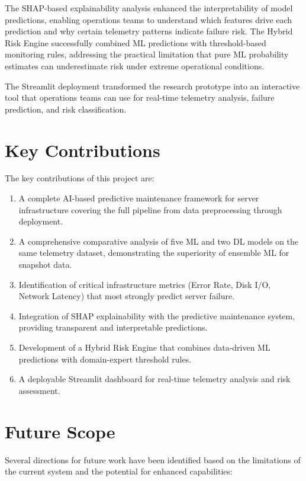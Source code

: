 \documentclass[12pt,letterpaper]{report}
\begin{document}
The SHAP-based explainability analysis enhanced the interpretability of model predictions, enabling operations teams to understand which features drive each prediction and why certain telemetry patterns indicate failure risk. The Hybrid Risk Engine successfully combined ML predictions with threshold-based monitoring rules, addressing the practical limitation that pure ML probability estimates can underestimate risk under extreme operational conditions.

The Streamlit deployment transformed the research prototype into an interactive tool that operations teams can use for real-time telemetry analysis, failure prediction, and risk classification.

\section{Key Contributions}

The key contributions of this project are:

\begin{enumerate}[label=\arabic*.]
  \item A complete AI-based predictive maintenance framework for server infrastructure covering the full pipeline from data preprocessing through deployment.
  \item A comprehensive comparative analysis of five ML and two DL models on the same telemetry dataset, demonstrating the superiority of ensemble ML for snapshot data.
  \item Identification of critical infrastructure metrics (Error Rate, Disk I/O, Network Latency) that most strongly predict server failure.
  \item Integration of SHAP explainability with the predictive maintenance system, providing transparent and interpretable predictions.
  \item Development of a Hybrid Risk Engine that combines data-driven ML predictions with domain-expert threshold rules.
  \item A deployable Streamlit dashboard for real-time telemetry analysis and risk assessment.
\end{enumerate}

\section{Future Scope}

Several directions for future work have been identified based on the limitations of the current system and the potential for enhanced capabilities:
\end{document}
